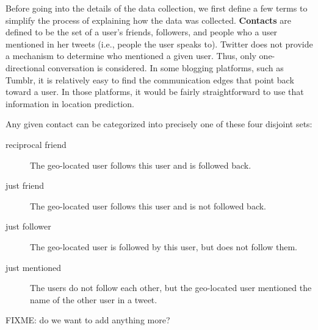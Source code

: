 Before going into the
details of the data collection, we first define a few terms to simplify the
process of explaining how the data was collected.  \textbf{Contacts} are
defined to be the set of a user's friends, followers, and people who a user
mentioned in her tweets (i.e., people the user speaks to).  Twitter does not
provide a mechanism to determine who mentioned a given user.  Thus, only
one-directional conversation is considered.  In some blogging platforms, such
as Tumblr, it is relatively easy to find the communication edges that point
back toward a user.  In those platforms, it would be fairly straightforward to
use that information in location prediction.

Any given contact can be categorized into precisely one of these four disjoint
sets:
\begin{description}
\item[reciprocal friend] The geo-located user follows this user and is followed
    back.
\item[just friend] The geo-located user follows this user and is not followed
    back.
\item[just follower] The geo-located user is followed by this user, but does
    not follow them.
\item[just mentioned] The users do not follow each other, but the geo-located
    user mentioned the name of the other user in a tweet.
\end{description}

FIXME: do we want to add anything more?
